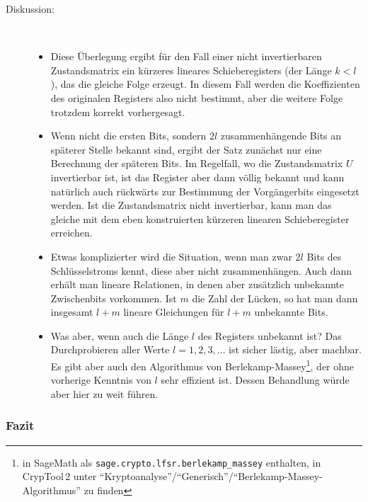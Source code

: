 \begin{refsegment}
\begin{description}
   \item[Diskussion:] ~
      \begin{itemize}
         \item Diese Überlegung ergibt für den Fall einer nicht invertierbaren
            Zustandsmatrix ein kürzeres lineares Schieberegisters (der Länge
            $k < l$), das die gleiche Folge erzeugt. In diesem Fall werden
            die Koeffizienten des originalen Registers also nicht bestimmt,
            aber die weitere Folge trotzdem korrekt vorhergesagt.
         \item Wenn nicht die ersten Bits, sondern $2l$ zusammenhängende
            Bits an späterer Stelle bekannt sind, ergibt der Satz zunächst
            nur eine Berechnung der späteren Bits. Im Regelfall, wo die
            Zustandsmatrix $U$ invertierbar ist, ist das Register aber
            dann völlig bekannt und kann natürlich auch rückwärts zur
            Bestimmung der Vorgängerbits eingesetzt werden. Ist die
            Zustandsmatrix nicht invertierbar, kann man das gleiche mit dem
            eben konstruierten kürzeren linearen Schieberegister erreichen.
         \item Etwas komplizierter wird die Situation, wenn man zwar $2l$
            Bits des Schlüsselstroms kennt, diese aber nicht zusammenhängen.
            Auch dann erhält man lineare Relationen, in denen aber
            zusätzlich unbekannte Zwischenbits vorkommen. Ist $m$ die Zahl
            der Lücken, so hat man dann insgesamt $l+m$ lineare Gleichungen
            für $l+m$ unbekannte Bits.
         \item Was aber, wenn auch die Länge $l$ des Registers unbekannt ist?
            Das Durchprobieren aller Werte $l = 1, 2, 3, \ldots$ ist sicher
            lästig, aber machbar. Es gibt aber auch den Algorithmus von
            Berlekamp-Massey\footnote{%
            in SageMath als {\tt sage.crypto.lfsr.berlekamp\_massey} enthalten,
            in CrypTool\,2 unter
            "`Kryptoanalyse"'/"`Generisch"'/"`Berlekamp-Massey-Algorithmus"'
            zu finden
            }, der ohne vorherige Kenntnis
            von $l$ sehr effizient ist. Dessen Behandlung würde aber hier
            zu weit führen.
      \end{itemize}
\end{description}

\subsubsection*{Fazit}


\end{refsegment}
